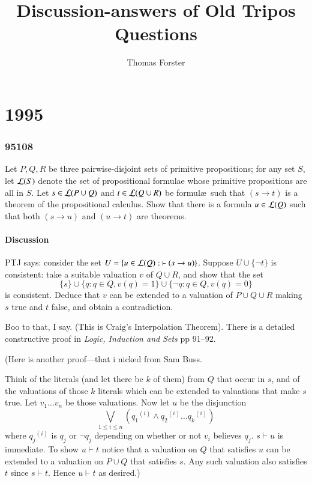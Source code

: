 \documentclass{book}
\begin{document}
 \title{Discussion-answers of Old Tripos Questions}
 \author{Thomas Forster}
  \maketitle





\chapter{1995}
\subsection*{95108} 

Let $P,Q,R$ be three pairwise-disjoint sets of primitive propositions;
for any set $S$, let ${\cal L}(S)$ denote the set of propositional
formulae whose primitive propositions are all in $S$. Let $s\in {\cal
  L}(P\cup Q)$ and $t\in{\cal L}(Q\cup R)$ be formul{\ae}\ such that
$(s\to t)$ is a theorem of the propositional calculus. Show that there
is a formula $u\in{\cal L}(Q)$ such that both $(s\to u)$ and $(u\to
t)$ are theorems. 

\subsubsection*{Discussion}

PTJ says: consider the set $U=\{u\in{\cal
    L}(Q):\ \vdash(s\to u)\}$. Suppose $U\cup\{\neg t\}$ is
  consistent: take a suitable valuation $v$ of $Q\cup R$, and show
  that the set $$\{s\}\cup\{q: q\in Q, v(q)=1\}\cup\{\neg q: q\in Q,
  v(q)=0\}$$ is consistent. Deduce that $v$ can be extended to a
  valuation of $P\cup Q\cup R$ making $s$ true and $t$ false, and
  obtain a contradiction.

\medskip

Boo to that, I say. (This is Craig's Interpolation Theorem).  There 
is a detailed constructive proof in {\sl Logic, Induction and Sets} 
pp 91--92.

(Here is another proof---that i nicked from Sam Buss. 

Think of the literals (and let there be $k$ of them) from
$Q$ that occur in $s$, and of the valuations of those $k$ literals
which can be extended to valuations that make $s$ true. Let 
$v_1 \ldots v_n$ be those valuations.  Now let $u$ be
the disjunction 
$$\bigvee_{1 \leq i \leq n}({q_1}^{(i)} \wedge {q_2}^{(i)} \ldots {q_k}^{(i)})$$
where ${q_j}^{(i)}$ is $q_j$ or $\neg q_j$ depending on whether or not
$v_i$ believes $q_j$. $s \vdash u$ is immediate. To show $u
\vdash t$ notice that a valuation on $Q$ that satisfies $u$ can be
extended to a valuation on $P \cup Q$ that satisfies $s$.  Any such
valuation also satisfies $t$ since $s \vdash t$.  Hence $u \vdash t$
as desired.)
\end{document}
